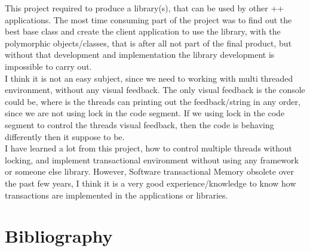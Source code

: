 \documentclass[12pt]{article}
\begin{document}
This project required to produce a library(s), that can be used by other ++ applications. The most time consuming part of the project was to find out the best base class and create the client application to use the library, with the polymorphic objects/classes, that is after all not part of the final product, but without that development and implementation the library development is impossible to carry out.\\

I think it is not an easy subject, since we need to working with multi threaded environment, without any visual feedback. The only visual feedback is the console could be, where is the threads can printing out the feedback/string in any order, since we are not using lock in the code segment. If we using lock in the code segment to control the threads visual feedback, then the code is behaving differently then it suppose to be.\\ 

I have learned a lot from this project, how to control multiple threads without locking, and implement transactional environment without using any framework or someone else library. However, Software transactional Memory obsolete over the past few years, I think it is a very good experience/knowledge to know how transactions are implemented in the applications or libraries.
\newpage
\section{Bibliography}
\begin{center}



\end{center}
\end{document}
